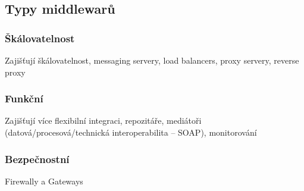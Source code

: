 \subsection{Typy middlewarů}

\subsubsection*{Škálovatelnost}

Zajišťují škálovatelnost, messaging servery, load balancers, proxy servery, reverse proxy

\subsubsection*{Funkční}

Zajišťují více flexibilní integraci, repozitáře, mediátoři (datová/procesová/technická interoperabilita -- SOAP), monitorování

\subsubsection*{Bezpečnostní}

Firewally a Gateways
